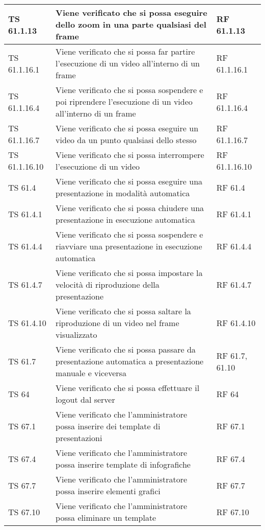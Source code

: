 {{\begin{longtable} [c]{| p{3cm} | p{6cm} |p{3cm}|}
			\hline
			TS 61.1.13 & Viene verificato che si possa eseguire dello zoom in una parte qualsiasi del frame\ped{g} & RF 61.1.13\\
			\hline
			TS 61.1.16.1 & Viene verificato che si possa far partire l'esecuzione di un video all'interno di un frame\ped{g} & RF 61.1.16.1\\
			\hline
			TS 61.1.16.4 & Viene verificato che si possa sospendere\ped{g} e poi riprendere l'esecuzione di un video all'interno di un frame\ped{g} & RF 61.1.16.4\\
			\hline
			TS 61.1.16.7 & Viene verificato che si possa eseguire un video da un punto qualsiasi dello stesso & RF 61.1.16.7\\
			\hline
			TS 61.1.16.10 & Viene verificato che si possa interrompere l'esecuzione di un video & RF 61.1.16.10\\
			\hline
			TS 61.4 & Viene verificato che si possa eseguire una presentazione in modalità automatica & RF 61.4\\
			\hline
			TS 61.4.1 & Viene verificato che si possa chiudere una presentazione in esecuzione automatica & RF 61.4.1\\
			\hline
			TS 61.4.4 & Viene verificato che si possa sospendere\ped{g} e riavviare una presentazione in esecuzione automatica & RF 61.4.4\\
			\hline
			TS 61.4.7 & Viene verificato che si possa impostare la velocità di riproduzione della presentazione & RF 61.4.7\\
			\hline
			TS 61.4.10 & Viene verificato che si possa saltare la riproduzione di un video nel frame\ped{g} visualizzato & RF 61.4.10\\
			\hline
			TS 61.7 & Viene verificato che si possa passare da presentazione automatica a presentazione manuale e viceversa & RF 61.7, 61.10\\
			\hline
			TS 64 & Viene verificato che si possa effettuare il logout\ped{g} dal server\ped{g} & RF 64\\
			\hline
			TS 67.1 & Viene verificato che l'amministratore possa inserire dei template\ped{g} di presentazioni & RF 67.1\\
			\hline
			TS 67.4 & Viene verificato che l'amministratore possa inserire template\ped{g} di infografiche\ped{g} & RF 67.4\\
			\hline
			TS 67.7 & Viene verificato che l'amministratore possa inserire elementi grafici & RF 67.7\\
			\hline
			TS 67.10 & Viene verificato che l'amministratore possa eliminare un template\ped{g} & RF 67.10\\

\end{longtable}}}
